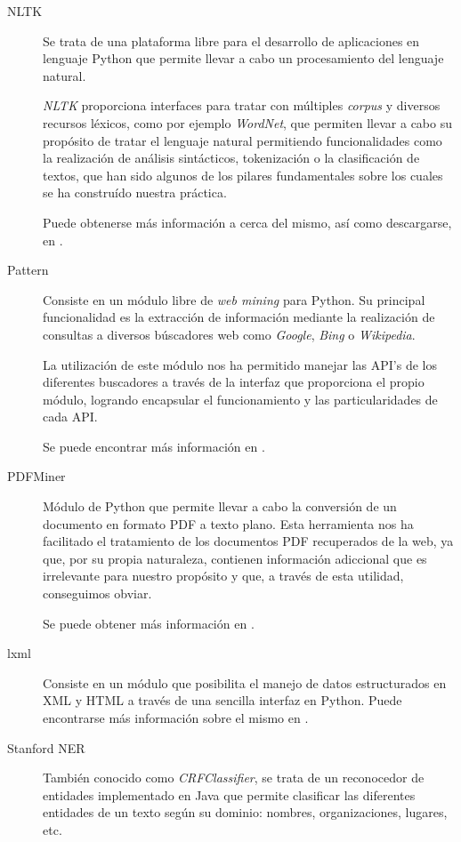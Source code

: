 \documentclass[12pt,a4paper,titlepage]{article}
\begin{document}
\begin{description}
	\item[NLTK] Se trata de una plataforma libre para el desarrollo de aplicaciones en lenguaje Python que permite llevar a cabo un procesamiento del lenguaje natural.

\emph{NLTK} proporciona interfaces para tratar con múltiples \emph{corpus} y diversos recursos léxicos, como por ejemplo \emph{WordNet}, que permiten llevar a cabo su propósito de tratar el lenguaje natural permitiendo funcionalidades como la realización de análisis sintácticos, tokenización o la clasificación de textos, que han sido algunos de los pilares fundamentales sobre los cuales se ha construído nuestra práctica.

Puede obtenerse más información a cerca del mismo, así como descargarse, en \cite{nltk}.

	\item[Pattern] Consiste en un módulo libre de \emph{web mining} para Python. Su principal funcionalidad es la extracción de información mediante la realización de consultas a diversos búscadores web como \emph{Google}, \emph{Bing} o \emph{Wikipedia}.

La utilización de este módulo nos ha permitido manejar las API's de los diferentes buscadores a través de la interfaz que proporciona el propio módulo, logrando encapsular el funcionamiento y las particularidades de cada API.

Se puede encontrar más información en \cite{pattern}.

	\item[PDFMiner] Módulo de Python que permite llevar a cabo la conversión de un documento en formato PDF a texto plano. Esta herramienta nos ha facilitado el tratamiento de los documentos PDF recuperados de la web, ya que, por su propia naturaleza, contienen información adiccional que es irrelevante para nuestro propósito y que, a través de esta utilidad, conseguimos obviar.

Se puede obtener más información en \cite{pdfminer}.

	\item[lxml] Consiste en un módulo que posibilita el manejo de datos estructurados en XML y HTML a través de una sencilla interfaz en Python. Puede encontrarse más información sobre el mismo en \cite{lxml}.

	\item[Stanford NER] También conocido como \emph{CRFClassifier}, se trata de un reconocedor de entidades implementado en Java que permite clasificar las diferentes entidades de un texto según su dominio: nombres, organizaciones, lugares, etc.


\end{description}
\end{document}

